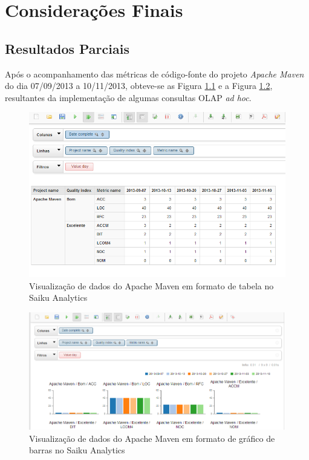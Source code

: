 \chapter{Considerações Finais}


\section{Resultados Parciais}

Após o acompanhamento das métricas de código-fonte do projeto \textit{Apache Maven} do dia 07/09/2013 a 10/11/2013, obteve-se as Figura \ref{table} e a Figura \ref{chart}, resultantes da implementação de algumas consultas OLAP  \textit{ad hoc}.



\begin{figure}[ht!]
\centering
\includegraphics[bb=0 0 1257 350, scale=0.83]{figuras/indicadores.png}
\caption{Visualização de dados do Apache Maven em formato de tabela no Saiku Analytics}
\label{table}
\end{figure}
\FloatBarrier
 



\begin{figure}[ht!]
\centering
\includegraphics[bb=0 0 1257 350, scale=0.63]{figuras/indicadores_graficos.png}
\caption{Visualização de dados do Apache Maven em formato de gráfico de barras no Saiku Analytics}
\label{chart}
\end{figure}
\FloatBarrier

